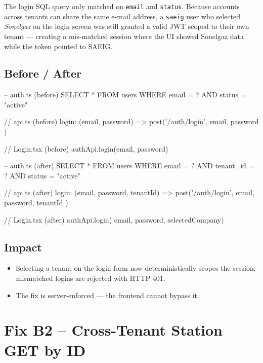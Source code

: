 \documentclass[12pt,a4paper]{report}
\newcommand{\diffL}{\noindent\begin{minipage}[t]{0.485\linewidth}}
\newcommand{\diffR}{\end{minipage}\hfill\begin{minipage}[t]{0.485\linewidth}}
\newcommand{\diffend}{\end{minipage}\par\smallskip}
\begin{document}
	The login SQL query only matched on \texttt{email} and \texttt{status}.
	Because accounts across tenants can share the same e-mail address, a
	\texttt{saeig} user who selected \emph{Sonelgaz} on the login screen was
	still granted a valid JWT scoped to their own tenant --- creating a
	mis-matched session where the UI showed Sonelgaz data while the token
	pointed to SAEIG.

	\subsection*{Before / After}

	\diffL
	\begin{beforecode}
-- auth.ts (before)
SELECT * FROM users
WHERE email = ?
  AND status = "active"

// api.ts (before)
login: (email, password) =>
  post('/auth/login',
    { email, password })

// Login.tsx (before)
authApi.login(email, password)
	\end{beforecode}
	\diffR
	\begin{aftercode}
-- auth.ts (after)
SELECT * FROM users
WHERE email = ?
  AND tenant_id = ?
  AND status = "active"

// api.ts (after)
login: (email, password, tenantId) =>
  post('/auth/login',
    { email, password, tenantId })

// Login.tsx (after)
authApi.login(
  email, password, selectedCompany)
	\end{aftercode}
	\diffend

	\subsection*{Impact}
	\begin{itemize}
		\item Selecting a tenant on the login form now deterministically scopes the session; mismatched logins are rejected with HTTP 401.
		\item The fix is server-enforced --- the frontend cannot bypass it.
	\end{itemize}

	\section{Fix B2 -- Cross-Tenant Station GET by ID}
\end{document}
